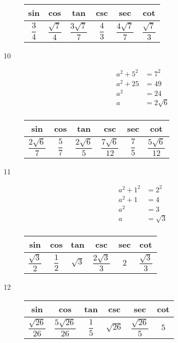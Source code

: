 \documentclass[fleqn,addpoints]{exam}
\begin{document}
\begin{description}
\begin{tabular}{cccccc}
\toprule
sin & cos & tan & csc & sec & cot \\
\midrule
  $\dfrac{3}{4}$ &  $\dfrac{\sqrt{7}}{4}$ & $\dfrac{3 \sqrt{7}}{7}$ & $\dfrac{4}{3}$ & $\dfrac{4 \sqrt{7}}{7}$ & $\dfrac{\sqrt{7}}{3}$ \\
\bottomrule
\end{tabular}

\item[10]
\begin{align*}
  a^2 + 5^2 &= 7^2 \\
  a^2 + 25 &= 49 \\
  a^2 &= 24 \\
  a &= 2\sqrt{6} \\
\end{align*}

\begin{tabular}{cccccc}
\toprule
sin & cos & tan & csc & sec & cot \\
\midrule
  $\dfrac{2 \sqrt{6}}{7}$ &  $\dfrac{5}{7}$ & $\dfrac{2 \sqrt{6}}{5}$ & $\dfrac{7 \sqrt{6}}{12}$ & $\dfrac{7}{5}$ & $\dfrac{5 \sqrt{6}}{12}$ \\
\bottomrule
\end{tabular}

\item[11]
\begin{align*}
  a^2 + 1^2 &= 2^2 \\
  a^2 + 1 &= 4 \\
  a^2 &= 3 \\
  a &= \sqrt{3} \\
\end{align*}

\begin{tabular}{cccccc}
\toprule
sin & cos & tan & csc & sec & cot \\
\midrule
  $\dfrac{\sqrt{3}}{2}$ &  $\dfrac{1}{2}$ & $\sqrt{3}$ & $\dfrac{2 \sqrt{3}}{3}$ & $2$ & $\dfrac{\sqrt{3}}{3}$ \\
\bottomrule
\end{tabular}

\item[12]

\begin{tabular}{cccccc}
\toprule
sin & cos & tan & csc & sec & cot \\
\midrule
  $\dfrac{\sqrt{26}}{26}$ &  $\dfrac{5 \sqrt{26}}{26}$ & $\dfrac{1}{5}$ & $\sqrt{26}$ & $\dfrac{\sqrt{26}}{5}$ & $5$ \\
\bottomrule
\end{tabular}


\end{description}
\end{document}

